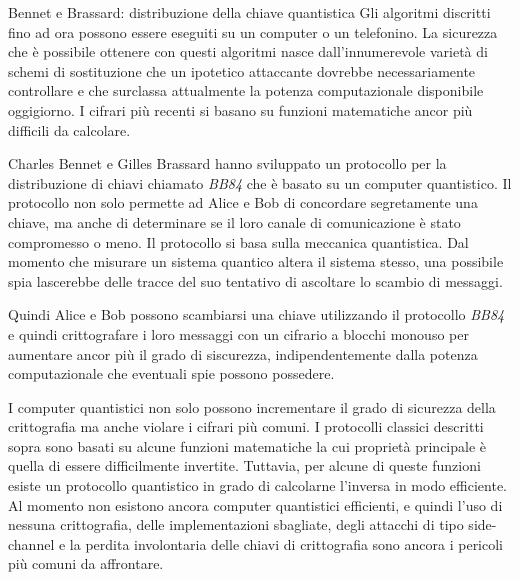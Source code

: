 \documentclass[final,hyperref={pdfpagelabels=false}]{beamer}
\begin{document}
\begin{frame}{}
\begin{columns}[t]
\begin{column}{.3\linewidth}
        \begin{block}{Bennet e Brassard: distribuzione della chiave quantistica}
          Gli algoritmi discritti fino ad ora possono essere eseguiti su un computer o un telefonino. La sicurezza che è possibile ottenere con questi algoritmi nasce dall'innumerevole varietà di schemi di sostituzione che un ipotetico attaccante dovrebbe necessariamente controllare e che surclassa attualmente la potenza computazionale disponibile oggigiorno. I cifrari più recenti si basano su funzioni matematiche ancor più difficili da calcolare. \par
          Charles Bennet e Gilles Brassard hanno sviluppato un protocollo per la distribuzione di chiavi chiamato {\em BB84} che è basato su un computer quantistico. Il protocollo non solo permette ad Alice e Bob di concordare segretamente una chiave, ma anche di determinare se il loro canale di comunicazione è stato compromesso o meno. Il protocollo si basa sulla meccanica quantistica. Dal momento che misurare un sistema quantico altera il sistema stesso, una possibile spia lascerebbe delle tracce del suo tentativo di ascoltare lo scambio di messaggi. \par
          Quindi Alice e Bob possono scambiarsi una chiave utilizzando il protocollo {\em BB84} e quindi crittografare i loro messaggi con un cifrario a blocchi monouso per aumentare ancor più il grado di siscurezza, indipendentemente dalla potenza computazionale che eventuali spie possono possedere. \par
          I computer quantistici non solo possono incrementare il grado di sicurezza della crittografia ma anche violare i cifrari più comuni.
          I protocolli classici descritti sopra sono basati su alcune funzioni matematiche la cui proprietà principale è quella di essere difficilmente invertite. Tuttavia, per alcune di queste funzioni esiste un protocollo quantistico in grado di calcolarne l'inversa in modo efficiente. Al momento non esistono ancora computer quantistici efficienti, e quindi l'uso di nessuna crittografia, delle implementazioni sbagliate, degli attacchi di tipo side-channel e la perdita involontaria delle chiavi di crittografia sono ancora i pericoli più comuni da affrontare.
        \end{block}
      \end{column}
    \end{columns}
  \end{frame}
\end{document}

